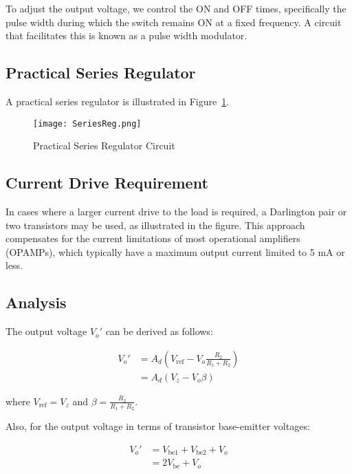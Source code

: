 \documentclass[a4paper,9pt,twoside,openany,twocolumn]{memoir}
\begin{document}
To adjust the output voltage, we control the ON and OFF times, specifically the pulse width during which the switch remains ON at a fixed frequency. A circuit that facilitates this is known as a pulse width modulator.

\subsection{Practical Series Regulator}

A practical series regulator is illustrated in Figure~\ref{fig:series-regulator}.

\begin{figure}[H]
    \centering
    \texttt{[image: SeriesReg.png]} %
    \caption{Practical Series Regulator Circuit}
    \label{fig:series-regulator}
\end{figure}

\subsection{Current Drive Requirement}

In cases where a larger current drive to the load is required, a Darlington pair or two transistors may be used, as illustrated in the figure. This approach compensates for the current limitations of most operational amplifiers (OPAMPs), which typically have a maximum output current limited to 5 mA or less.

\subsection{Analysis}

The output voltage \( V_o' \) can be derived as follows:

\begin{align}
    V_o' &= A_d \left( V_{\text{ref}} - V_o \frac{R_2}{R_1 + R_2} \right) \tag{1} \\
    &= A_d (V_z - V_o \beta) \tag{2}
\end{align}

where \( V_{\text{ref}} = V_z \) and \( \beta = \frac{R_2}{R_1 + R_2} \).

Also, for the output voltage in terms of transistor base-emitter voltages:

\begin{align}
    V_o' &= V_{\text{be1}} + V_{\text{be2}} + V_o \tag{3} \\
    &= 2V_{\text{be}} + V_o \tag{4}
\end{align}
\end{document}

